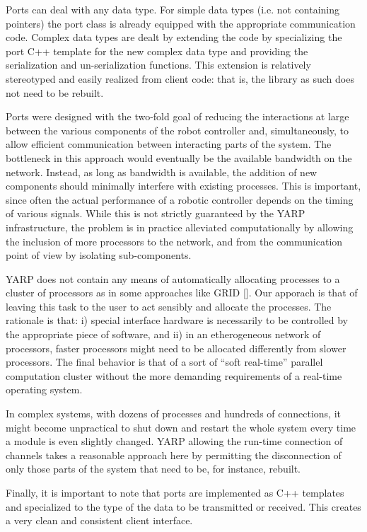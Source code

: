 Ports can deal with any data type. For simple data types (i.e. not containing pointers) 
the port class is already equipped with the appropriate communication code. Complex data
types are dealt by extending the code by specializing the port C++ template for the 
new complex data type and providing the serialization and un-serialization functions. 
This extension is relatively stereotyped and easily realized from client code: that is, 
the library as such does not need to be rebuilt.

Ports were designed with the two-fold goal of reducing the interactions at large between 
the various components of the robot controller and, simultaneously, to allow efficient 
communication between interacting parts of the system. The bottleneck in this approach
would eventually be the available bandwidth on the network. Instead, as long as bandwidth
is available, the addition of new components should minimally interfere with existing 
processes. This is important, since often the actual performance of a robotic controller
depends on the timing of various signals. While this is not strictly guaranteed by the 
YARP infrastructure, the problem is in practice alleviated computationally by allowing 
the inclusion of more processors to the network, and from the communication point of view
by isolating sub-components.

YARP does not contain any means of automatically allocating processes to a cluster of
processors as in some approaches like GRID []. Our apporach is that of leaving this
task to the user to act sensibly and allocate the processes. The rationale is that: i)
special interface hardware is necessarily to be controlled by the appropriate piece of 
software, and ii) in an etherogeneous network of processors, faster processors might 
need to be allocated differently from slower processors. The final behavior is that of 
a sort of ``soft real-time'' parallel computation cluster without the more demanding
requirements of a real-time operating system.

In complex systems, with dozens of processes and hundreds of connections, it might become
unpractical to shut down and restart the whole system every time a module is even slightly 
changed. YARP allowing the run-time connection of channels takes a reasonable approach
here by permitting the disconnection of only those parts of the system that need to be, 
for instance, rebuilt.

Finally, it is important to note that ports are implemented as C++ templates and 
specialized to the type of the data to be transmitted or received. This creates a very 
clean and consistent client interface.


